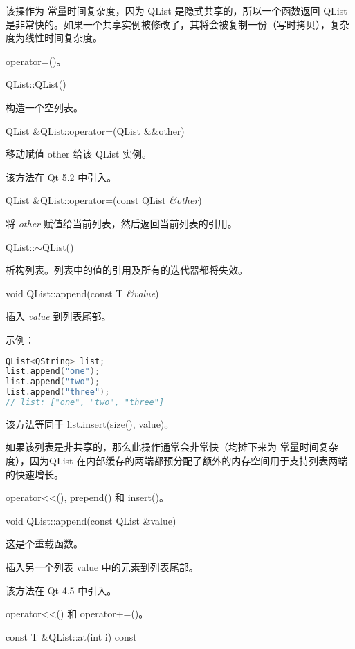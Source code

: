 该操作为 常量时间复杂度，因为 QList 是隐式共享的，所以一个函数返回 QList 是非常快的。如果一个共享实例被修改了，其将会被复制一份（写时拷贝），复杂度为线性时间复杂度。

\begin{seeAlso}
operator=()。
\end{seeAlso}

QList::QList()

构造一个空列表。

QList \&QList::operator=(QList \&\&other)

移动赋值 other 给该 QList 实例。

该方法在 Qt 5.2 中引入。

QList \&QList::operator=(const QList \emph{\&other})

将 \emph{other} 赋值给当前列表，然后返回当前列表的引用。

QList::$\sim$QList()

析构列表。列表中的值的引用及所有的迭代器都将失效。

void QList::append(const T \emph{\&value})

插入 \emph{value} 到列表尾部。

示例：

\begin{lstlisting}[language=C++]
QList<QString> list;
list.append("one");
list.append("two");
list.append("three");
// list: ["one", "two", "three"]
\end{lstlisting}

该方法等同于 list.insert(size(), value)。

如果该列表是非共享的，那么此操作通常会非常快（均摊下来为 常量时间复杂度），因为QList 在内部缓存的两端都预分配了额外的内存空间用于支持列表两端的快速增长。




\begin{seeAlso}
operator<<(), prepend() 和 insert()。
\end{seeAlso}



void QList::append(const QList \&value)

这是个重载函数。

插入另一个列表 value 中的元素到列表尾部。

该方法在 Qt 4.5 中引入。

\begin{seeAlso}
 operator<<() 和 operator+=()。
\end{seeAlso}


const T \&QList::at(int i) const


